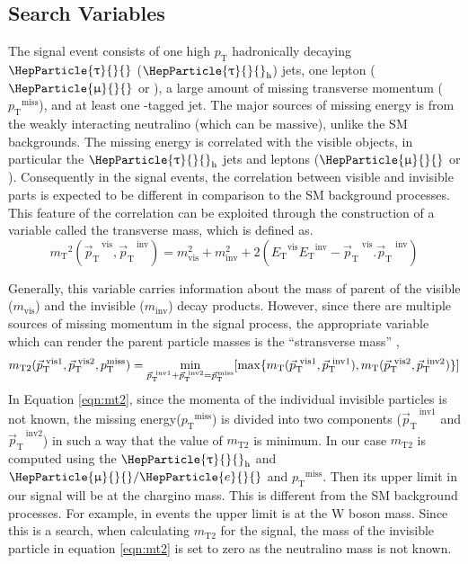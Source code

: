 \documentclass[12pt, a4paper]{article}
\newcommand{\pt}{\ensuremath{p_{\mathrm{T}}}\xspace}
\newcommand{\ptmiss}{\ensuremath{\pt^\text{miss}}}
\newcommand{\mT}{\ensuremath{m_{\mathrm{T}}}\xspace}
\newcommand{\ptvec}{\ensuremath{{\vec p}_{\mathrm{T}}}\xspace}
\newcommand{\ptvecmiss}{\ensuremath{{\vec p}_{\mathrm{T}}^{\kern1pt\text{miss}}}\xspace}
\newcommand{\mTii}{\ensuremath{m_{\mathrm{T2}}}\xspace}
\newcommand{\ET}{\ensuremath{E_{\mathrm{T}}}\xspace}
\DeclareRobustCommand{\PQb}{{\HepParticle{b}{}{}}\xspace} %
\DeclareRobustCommand{\PQt}{\HepParticle{t}{}{}} %
\DeclareRobustCommand{\PAQt}{{\HepAntiParticle{\PQt}{}{}}\xspace} %
\DeclareRobustCommand{\Pe}{{\HepParticle{e}{}{}}\xspace} %
\DeclareRobustCommand{\PGm}{{\HepParticle{\upmu}{}{}}\xspace} %
\DeclareRobustCommand{\PGt}{{\HepParticle{\uptau}{}{}}\xspace} %
\newcommand{\ttbar}{\PQt{}\PAQt} %
\newcommand{\tauh}{\ensuremath{\PGt_\mathrm{h}}\xspace}
\begin{document}
\subsection{Search Variables}
The signal event consists of one high \pt hadronically decaying $\PGt$ (\tauh) jets, one lepton ($\PGm$ or \Pe), a large amount of missing transverse momentum (\ptmiss), and at least one \PQb-tagged jet. The major sources of missing energy is from the weakly interacting neutralino (which can be massive), unlike the SM backgrounds. The missing energy is correlated with the visible objects, in particular the \tauh jets and leptons ($\PGm$ or \Pe). Consequently in the signal events, the correlation between visible and invisible parts is expected to be different in comparison to the SM background processes. This feature of the correlation can be exploited through the construction of a variable called the transverse mass, which is defined as.
\begin{equation}
\mT^{2}(\ptvec^{~\text{vis}},\ptvec^{~\text{inv}}) = m_{\text{vis}}^{2}+m_{\text{inv}}^{2}+2(\ET^{\text{vis}}\ET^{\text{inv}}-\ptvec^{\text{~vis}}.\ptvec^{\text{~inv}})
\label{eqn:mT}
\end{equation}

Generally, this variable carries information about the mass of parent of the visible ($m_{\text{vis}}$) and the invisible ($m_{\text{inv}}$) decay products. However, since there are multiple sources of missing momentum in the signal process, the appropriate variable which can render the parent particle masses is the ``stransverse mass'' \cite{Lester:1999tx, Barr:2003rg, Barr:2009wu},
\begin{equation}
\mTii(\ptvec^{\text{~vis1}}, \ptvec^{\text{~vis2}}, \ptmiss) = \min_{\ptvec^{~\text{inv1}}+\ptvec^{~\text{inv2}}=\ptvecmiss}[\max\{\mT(\ptvec^{~\text{vis1}},\ptvec^{~\text{inv1}}), \mT(\ptvec^{~\text{vis2}},\ptvec^{~\text{inv2}})\}]
\label{eqn:mt2}
\end{equation}
In Equation \ref{eqn:mt2}, since the momenta of the individual invisible particles is not known, the missing energy(\ptmiss) is divided into two components ($\ptvec^{~\text{inv1}}$ and $\ptvec^{~\text{inv2}}$) in such a way that the value of $\mTii$ is minimum. In our case $\mTii$ is computed using the \tauh and $\PGm/\Pe$ and \ptmiss. Then its upper limit in our signal will be at the chargino mass. This is different from the SM background processes. For example, in \ttbar events the upper limit is at the W boson mass. Since this is a search, when calculating $\mTii$ for the signal, the mass of the invisible particle in equation \ref{eqn:mt2} is set to zero as the neutralino mass is not known.
\end{document}
